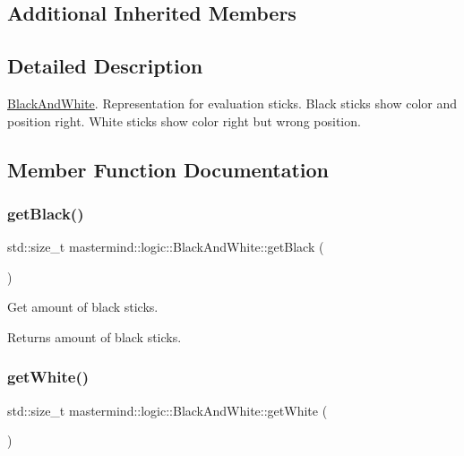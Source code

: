 \subsection*{Additional Inherited Members}


\subsection{Detailed Description}
\hyperlink{classmastermind_1_1logic_1_1_black_and_white}{Black\+And\+White}. Representation for evaluation sticks. Black sticks show color and position right. White sticks show color right but wrong position. 

\subsection{Member Function Documentation}
\hypertarget{classmastermind_1_1logic_1_1_black_and_white_a4ad1275ddb85c2bc5dd3c88943a69d4a}{}\label{classmastermind_1_1logic_1_1_black_and_white_a4ad1275ddb85c2bc5dd3c88943a69d4a} 
\subsubsection{\texorpdfstring{get\+Black()}{getBlack()}}
{\footnotesize\ttfamily std\+::size\+\_\+t mastermind\+::logic\+::\+Black\+And\+White\+::get\+Black (\begin{DoxyParamCaption}{ }\end{DoxyParamCaption})}



Get amount of black sticks. 

\begin{DoxyReturn}{Returns}
amount of black sticks. 
\end{DoxyReturn}
\hypertarget{classmastermind_1_1logic_1_1_black_and_white_a7ef40ad0a450a643e4def4b11b8e7e72}{}\label{classmastermind_1_1logic_1_1_black_and_white_a7ef40ad0a450a643e4def4b11b8e7e72} 
\subsubsection{\texorpdfstring{get\+White()}{getWhite()}}
{\footnotesize\ttfamily std\+::size\+\_\+t mastermind\+::logic\+::\+Black\+And\+White\+::get\+White (\begin{DoxyParamCaption}{ }\end{DoxyParamCaption})}



